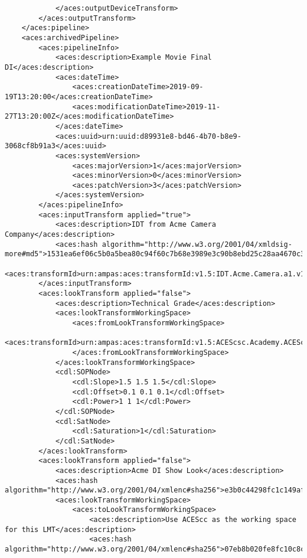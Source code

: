 \begin{lstlisting}
            </aces:outputDeviceTransform>
        </aces:outputTransform>
    </aces:pipeline>
    <aces:archivedPipeline>
        <aces:pipelineInfo>
            <aces:description>Example Movie Final DI</aces:description>
            <aces:dateTime>
                <aces:creationDateTime>2019-09-19T13:20:00</aces:creationDateTime>
                <aces:modificationDateTime>2019-11-27T13:20:00Z</aces:modificationDateTime>
            </aces:dateTime>
            <aces:uuid>urn:uuid:d89931e8-bd46-4b70-b8e9-3068cf8b91a3</aces:uuid>
            <aces:systemVersion>
                <aces:majorVersion>1</aces:majorVersion>
                <aces:minorVersion>0</aces:minorVersion>
                <aces:patchVersion>3</aces:patchVersion>
            </aces:systemVersion>
        </aces:pipelineInfo>
        <aces:inputTransform applied="true">
            <aces:description>IDT from Acme Camera Company</aces:description>
            <aces:hash algorithm="http://www.w3.org/2001/04/xmldsig-more#md5">1531ea6ef06c5b0a5bea80c94f60c7b68e3989e3c90b8ebd25c28aa4670c30f8</aces:hash>
            <aces:transformId>urn:ampas:aces:transformId:v1.5:IDT.Acme.Camera.a1.v1</aces:transformId>
        </aces:inputTransform>
        <aces:lookTransform applied="false">
            <aces:description>Technical Grade</aces:description>
            <aces:lookTransformWorkingSpace>
                <aces:fromLookTransformWorkingSpace>
                    <aces:transformId>urn:ampas:aces:transformId:v1.5:ACEScsc.Academy.ACEScct_to_ACES.a1.0.3</aces:transformId>
                </aces:fromLookTransformWorkingSpace>
            </aces:lookTransformWorkingSpace>
            <cdl:SOPNode>
                <cdl:Slope>1.5 1.5 1.5</cdl:Slope>
                <cdl:Offset>0.1 0.1 0.1</cdl:Offset>
                <cdl:Power>1 1 1</cdl:Power>
            </cdl:SOPNode>
            <cdl:SatNode>
                <cdl:Saturation>1</cdl:Saturation>
            </cdl:SatNode>
        </aces:lookTransform>
        <aces:lookTransform applied="false">
            <aces:description>Acme DI Show Look</aces:description>
            <aces:hash algorithm="http://www.w3.org/2001/04/xmlenc#sha256">e3b0c44298fc1c149afbf4c8996fb92427ae41e4649b934ca495991b7852b855</aces:hash>
            <aces:lookTransformWorkingSpace>
                <aces:toLookTransformWorkingSpace>
                    <aces:description>Use ACEScc as the working space for this LMT</aces:description>
                    <aces:hash algorithm="http://www.w3.org/2001/04/xmlenc#sha256">07eb8b020fe8fc10c8c4b983cc37798324c7eee1319f07dd0028fca96f904a7f</aces:hash>

\end{lstlisting}

